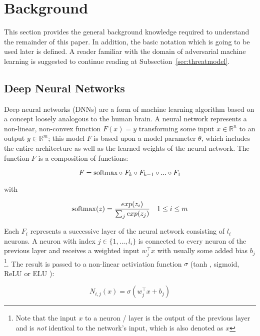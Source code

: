 
\section{Background}\label{sec:background}

This section provides the general background knowledge required to understand the remainder of this paper.
In addition, the basic notation which is going to be used later is defined.
A reader familiar with the domain of adversarial machine learning is suggested to continue reading at Subsection~\ref{sec:threatmodel}.

\subsection{Deep Neural Networks}\label{subsec:dnn}
Deep neural networks (DNNs) are a form of machine learning algorithm based on a concept loosely analogous to the human brain.
A neural network represents a non-linear, non-convex function $F(x) = y$ transforming some input $x \in \mathbb{R}^n$ to an output $y \in \mathbb{R}^m$; this model $F$ is based upon a model parameter $\theta$, which includes the entire architecture as well as the learned weights of the neural network. The function $F$ is a composition of functions:

\begin{equation*}
F = \operatorname{softmax} \circ\; F_k \circ F_{k-1} \circ ... \circ F_1
\end{equation*}

with

\begin{align*}
\operatorname{softmax}(z) = \frac{exp(z_i)}{\sum_j exp(z_j)} && 1 \leq i \leq m
\end{align*}

Each $F_i$ represents a successive layer of the neural network consisting of $l_i$ neurons. A neuron with index $j \in \{1,...,l_i\}$ is connected to every neuron of the previous layer and receives a weighted input $w_j^\top x$ with usually some added bias $b_j$\footnote{Note that the input $x$ to a neuron / layer is the output of the previous layer and is \emph{not} identical to the network's input, which is also denoted as $x$}. The result is passed to a non-linear activiation function $\sigma$ (tanh \cite{tanh}, sigmoid, ReLU \cite{relu} or ELU \cite{elu}):

\begin{equation*}
N_{i,j}(x) = \sigma(w_j^\top x + b_j)
\end{equation*}

